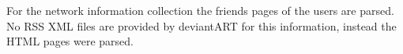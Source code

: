 For the network information collection the friends pages 
of the users are parsed. No RSS XML files are provided by deviantART for this
information, instead the HTML pages were parsed.





